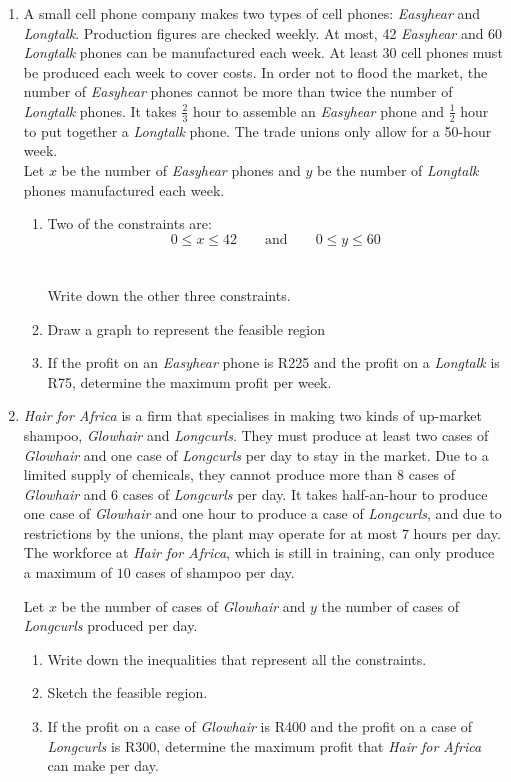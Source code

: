 \begin{enumerate}
\item{A small cell phone company makes two types of cell phones: \textit{Easyhear} and \textit{Longtalk}. Production figures are checked weekly. At most, 42 \textit{Easyhear} and 60 \textit{Longtalk} phones can be manufactured each week. At least 30 cell phones must be produced each week to cover costs. In order not to flood the market, the number of \textit{Easyhear} phones cannot be more than twice the number of \textit{Longtalk} phones. It takes $\tfrac{2}{3}$ hour to assemble an \textit{Easyhear} phone and $\tfrac{1}{2}$ hour to put together a \textit{Longtalk} phone. The trade unions only allow for a 50-hour week.\\ Let $x$ be the number of \textit{Easyhear} phones and $y$ be the number of \textit{Longtalk} phones manufactured each week.

\begin{enumerate}
\item{Two of the constraints are: $$0 \leq x \leq 42 \qquad \mathrm{and} \qquad 0 \leq y \leq 60$$\\ \\ Write down the other three constraints.}
\item{Draw a graph to represent the feasible region}
\item{If the profit on an \textit{Easyhear} phone is R225 and the profit on a \textit{Longtalk} is R75, determine the maximum profit per week.}
\end{enumerate}}

\item{\textit{Hair for Africa} is a firm that specialises in making two kinds of up-market shampoo, \textit{Glowhair} and \textit{Longcurls}. They must produce at least two cases of \textit{Glowhair} and one case of \textit{Longcurls} per day to stay in the market. Due to a limited supply of chemicals, they cannot produce more than $8$ cases of \textit{Glowhair} and $6$ cases of \textit{Longcurls} per day. It takes half-an-hour to produce one case of \textit{Glowhair} and one hour to produce a case of \textit{Longcurls}, and due to restrictions by the unions, the plant may operate for at most $7$ hours per day. The workforce at \textit{Hair for Africa}, which is still in training, can only produce a maximum of $10$ cases of shampoo per day.

Let $x$ be the number of cases of \textit{Glowhair} and $y$ the number of cases of \textit{Longcurls} produced per day.
\begin{enumerate}
\item{Write down the inequalities that represent all the constraints.}
\item{Sketch the feasible region.}
\item{If the profit on a case of \textit{Glowhair} is R400 and the profit on a case of \textit{Longcurls} is R300, determine the maximum profit that \textit{Hair for Africa} can make per day.}
\end{enumerate}}


\end{enumerate}
